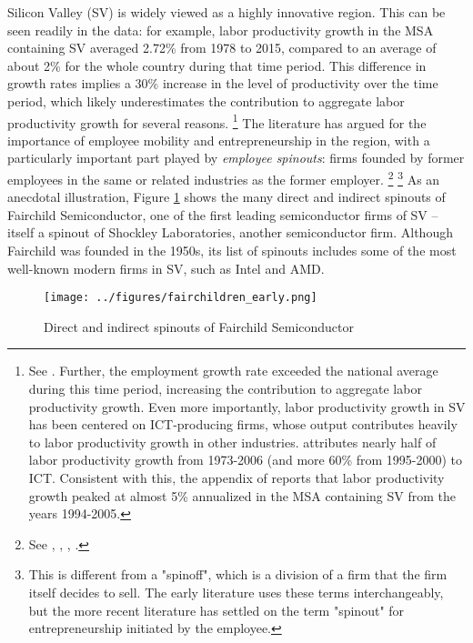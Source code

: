 \documentclass[12pt,english]{article}
\theoremstyle{remark}
\begin{document}
Silicon Valley (SV) is widely viewed as a highly innovative region. This can be seen readily in the data: for example, labor productivity growth in the MSA containing SV averaged 2.72\% from 1978 to 2015, compared to an average of about 2\% for the whole country during that time period. This difference in growth rates implies a 30\% increase in the level of productivity over the time period, which likely underestimates the contribution to aggregate labor productivity growth for several reasons. \footnote{See \cite{parilla_understanding_2017}. Further, the employment growth rate exceeded the national average during this time period, increasing the contribution to aggregate labor productivity growth. Even more importantly, labor productivity growth in SV has been centered on ICT-producing firms, whose output contributes heavily to labor productivity growth in other industries. \cite{jorgenson_retrospective_2008} attributes nearly half of labor productivity growth from 1973-2006 (and more 60\% from 1995-2000) to ICT. Consistent with this, the appendix of  \cite{parilla_understanding_2017} reports that labor productivity growth peaked at almost 5\% annualized in the MSA containing SV from the years 1994-2005.} The literature has argued for the importance of employee mobility and entrepreneurship in the region, with a particularly important part played by \textit{employee spinouts}: firms founded by former employees in the same or related industries as the former employer. \footnote{See \cite{saxenian_regional_1994}, \cite{gilson_legal_1999}, \cite{fallick_job-hopping_2006}, \cite{franco_covenants_2008}.} \footnote{This is different from a "spinoff", which is a division of a firm that the firm itself decides to sell. The early literature uses these terms interchangeably, but the more recent literature has settled on the term "spinout" for entrepreneurship initiated by the employee.} As an anecdotal illustration, Figure \ref{fairchild_spinouts} shows the many direct and indirect spinouts of Fairchild Semiconductor, one of the first leading semiconductor firms of SV -- itself a spinout of Shockley Laboratories, another semiconductor firm. Although Fairchild was founded in the 1950s, its list of spinouts includes some of the most well-known modern firms in SV, such as Intel and AMD. 

\begin{figure}	
	\center
	\texttt{[image: ../figures/fairchildren\_early.png]}
	\caption{Direct and indirect spinouts of Fairchild Semiconductor}
	\label{fairchild_spinouts}
\end{figure}
\end{document}
